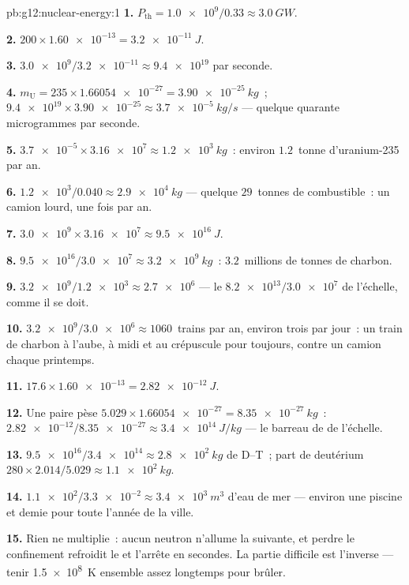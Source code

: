 \begin{solution}{pb:g12:nuclear-energy:1}
\textbf{1.} $P_{\text{th}} = \num{1.0e9}/0.33 \approx \qty{3.0}{GW}$.

\textbf{2.} $200 \times \num{1.60e-13} = \qty{3.2e-11}{J}$.

\textbf{3.} $\num{3.0e9}/\num{3.2e-11} \approx \num{9.4e19}$
 par seconde.

\textbf{4.} $m_{\mathrm U} = 235 \times \num{1.66054e-27} =
\qty{3.90e-25}{kg}$~; $\num{9.4e19} \times \num{3.90e-25} \approx
\qty{3.7e-5}{kg/s}$ --- quelque quarante microgrammes par seconde.

\textbf{5.} $\num{3.7e-5} \times \num{3.16e7} \approx \qty{1.2e3}{kg}$~:
environ $1.2$~tonne d'uranium-235 par an.

\textbf{6.} $\num{1.2e3}/0.040 \approx \qty{2.9e4}{kg}$ --- quelque
$29$~tonnes de combustible~: un camion lourd, une fois par an.

\textbf{7.} $\num{3.0e9} \times \num{3.16e7} \approx \qty{9.5e16}{J}$.

\textbf{8.} $\num{9.5e16}/\num{3.0e7} \approx \qty{3.2e9}{kg}$~:
$3.2$~millions de tonnes de charbon.

\textbf{9.} $\num{3.2e9}/\num{1.2e3} \approx \num{2.7e6}$ --- le
$\num{8.2e13}/\num{3.0e7}$ de l'échelle, comme il se doit.

\textbf{10.} $\num{3.2e9}/\num{3.0e6} \approx 1060$~trains par an,
environ trois par jour~: un train de charbon à l'aube, à midi et au
crépuscule pour toujours, contre un camion chaque printemps.

\textbf{11.} $17.6 \times \num{1.60e-13} = \qty{2.82e-12}{J}$.

\textbf{12.} Une paire pèse $5.029 \times \num{1.66054e-27} =
\qty{8.35e-27}{kg}$~: $\num{2.82e-12}/\num{8.35e-27} \approx
\qty{3.4e14}{J/kg}$ --- le barreau de
 de l'échelle.

\textbf{13.} $\num{9.5e16}/\num{3.4e14} \approx \qty{2.8e2}{kg}$ de
D--T~; part de deutérium $280 \times 2.014/5.029 \approx \qty{1.1e2}{kg}$.

\textbf{14.} $\num{1.1e2}/\num{3.3e-2} \approx \qty{3.4e3}{m^3}$ d'eau
de mer --- environ une piscine et demie pour toute l'année de la ville.

\textbf{15.} Rien ne multiplie~: aucun neutron n'allume la
 suivante, et perdre le confinement
refroidit le  et l'arrête en secondes. La
partie difficile est l'inverse --- tenir \qty{1.5e8}{K} ensemble
assez longtemps pour brûler.


\end{solution}
